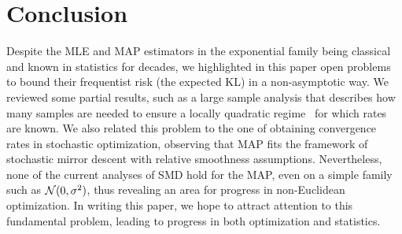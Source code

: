 \section{Conclusion}
Despite the MLE and MAP estimators in the exponential family being classical and known in statistics for decades, we highlighted in this paper open problems to bound their frequentist risk (the expected KL) in a non-asymptotic way. We reviewed some partial results, such as a large sample analysis that describes how many samples are needed to ensure a locally quadratic regime~\citep{kakade2010learning, ostrovskii2021finite} for which rates are known. We also related this problem to the one of obtaining convergence rates in stochastic optimization, observing that MAP fits the framework of stochastic mirror descent with relative smoothness assumptions.
Nevertheless, none of the current analyses of SMD hold for the MAP, even on a simple family such as ${\mathcal N}(0,\sigma^2)$, thus revealing an area for progress in non-Euclidean optimization.
In writing this paper, we hope to attract attention to this fundamental problem, leading to progress in both optimization and statistics.


\clearpage

